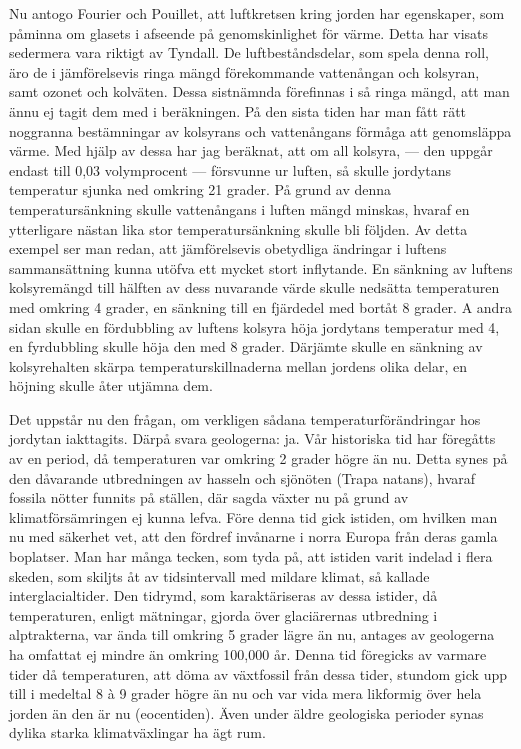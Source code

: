 \documentclass[a4paper, 12pt, oneside, swedish]{article}
\begin{document}
Nu antogo Fourier och Pouillet, att luftkretsen kring jorden har egenskaper, som påminna om glasets i afseende på genomskinlighet för värme. Detta har visats sedermera vara riktigt av Tyndall. De luftbeståndsdelar, som spela denna roll, äro de i jämförelsevis ringa mängd förekommande vattenångan och kolsyran, samt ozonet och kolväten. Dessa sistnämnda förefinnas i så ringa mängd, att man ännu ej tagit dem med i beräkningen. På den sista tiden har man fått rätt noggranna bestämningar av kolsyrans och vattenångans förmåga att genomsläppa värme. Med hjälp av dessa har jag beräknat, att om all kolsyra, --- den uppgår endast till 0,03 volymprocent --- försvunne ur luften, så skulle jordytans temperatur sjunka ned omkring 21 grader. På grund av denna temperatursänkning skulle vattenångans i luften mängd minskas, hvaraf en ytterligare nästan lika stor temperatursänkning skulle bli följden. Av detta exempel ser man redan, att jämförelsevis obetydliga ändringar i luftens sammansättning kunna utöfva ett mycket stort inflytande. En sänkning av luftens kolsyremängd till hälften av dess nuvarande värde skulle nedsätta temperaturen med omkring 4 grader, en sänkning till en fjärdedel med bortåt 8 grader. A andra sidan skulle en fördubbling av luftens kolsyra höja jordytans temperatur med 4, en fyrdubbling skulle höja den med 8 grader. Därjämte skulle en sänkning av kolsyrehalten skärpa temperaturskillnaderna mellan jordens olika delar, en höjning skulle åter utjämna dem.

Det uppstår nu den frågan, om verkligen sådana temperaturförändringar hos jordytan iakttagits. Därpå svara geologerna: ja. Vår historiska tid har föregåtts av en period, då temperaturen var omkring 2 grader högre än nu. Detta synes på den dåvarande utbredningen av hasseln och sjönöten (Trapa natans), hvaraf fossila nötter funnits på ställen, där sagda växter nu på grund av klimatförsämringen ej kunna lefva. Före denna tid gick istiden, om hvilken man nu med säkerhet vet, att den fördref invånarne i norra Europa från deras gamla boplatser. Man har många tecken, som tyda på, att istiden varit indelad i flera skeden, som skiljts åt av tidsintervall med mildare klimat, så kallade interglacialtider. Den tidrymd, som karaktäriseras av dessa istider, då temperaturen, enligt mätningar, gjorda över glaciärernas utbredning i alptrakterna, var ända till omkring 5 grader lägre än nu, antages av geologerna ha omfattat ej mindre än omkring 100,000 år. Denna tid föregicks av varmare tider då temperaturen, att döma av växtfossil från dessa tider, stundom gick upp till i medeltal 8 à 9 grader högre än nu och var vida mera likformig över hela jorden än den är nu (eocentiden). Även under äldre geologiska perioder synas dylika starka klimatväxlingar ha ägt rum.
\end{document}
